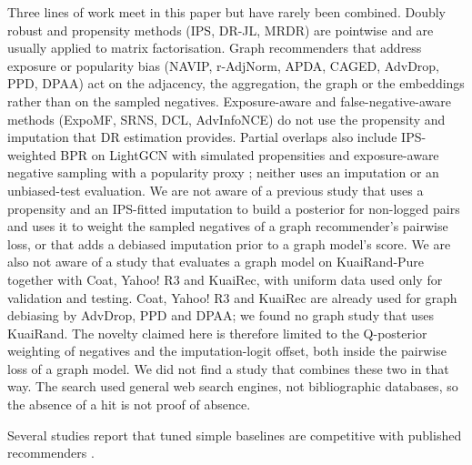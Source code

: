 Three lines of work meet in this paper but have rarely been combined. Doubly robust and
propensity methods (IPS, DR-JL, MRDR) are pointwise and are usually applied to matrix
factorisation. Graph recommenders that address exposure or popularity bias (NAVIP,
r-AdjNorm, APDA, CAGED, AdvDrop, PPD, DPAA) act on the adjacency, the aggregation, the graph
or the embeddings rather than on the sampled negatives. Exposure-aware and false-negative-aware
methods (ExpoMF, SRNS, DCL, AdvInfoNCE) do not use the propensity and imputation that DR
estimation provides. Partial overlaps also include IPS-weighted BPR on LightGCN with simulated
propensities \citep{raja2025ipsbpr} and exposure-aware negative sampling with a popularity proxy
\citep{chen2026icpns}; neither uses an imputation or an unbiased-test evaluation. We are not aware of a previous study that uses a propensity and an
IPS-fitted imputation to build a posterior for non-logged pairs and uses it to weight the
sampled negatives of a graph recommender's pairwise loss, or that adds a debiased imputation
prior to a graph model's score. We are also not aware of a study that evaluates a graph model
on KuaiRand-Pure together with Coat, Yahoo! R3 and KuaiRec, with uniform data used only for
validation and testing. Coat, Yahoo! R3 and KuaiRec are already used for graph debiasing by
AdvDrop, PPD and DPAA; we found no graph study that uses KuaiRand. The novelty claimed here is
therefore limited to the Q-posterior weighting of negatives and the imputation-logit offset,
both inside the pairwise loss of a graph model. We did not find a study that combines these two
in that way. The search used general web search engines, not bibliographic databases, so the
absence of a hit is not proof of absence.

Several studies report that tuned simple baselines are competitive with published recommenders
\citep{dacrema2019progress,rendle2019baselines,anelli2023myth}.
